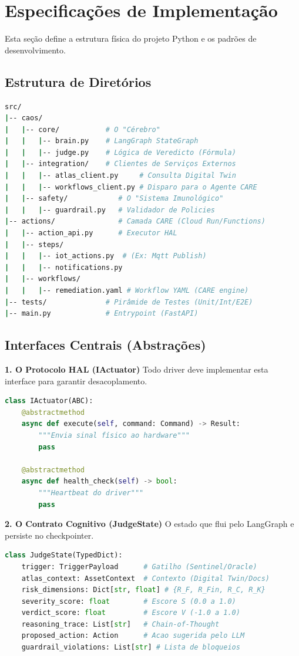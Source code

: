 \documentclass[12pt, a4paper]{article}
\begin{document}
\section{Especificações de Implementação}
\label{sec:specs}

Esta seção define a estrutura física do projeto Python e os padrões de desenvolvimento.

\subsection{Estrutura de Diretórios}
\begin{lstlisting}[language=bash]
src/
|-- caos/
|   |-- core/           # O "Cérebro"
|   |   |-- brain.py    # LangGraph StateGraph
|   |   |-- judge.py    # Lógica de Veredicto (Fórmula)
|   |-- integration/    # Clientes de Serviços Externos
|   |   |-- atlas_client.py     # Consulta Digital Twin
|   |   |-- workflows_client.py # Disparo para o Agente CARE
|   |-- safety/            # O "Sistema Imunológico"
|   |   |-- guardrail.py   # Validador de Policies
|-- actions/               # Camada CARE (Cloud Run/Functions)
|   |-- action_api.py      # Executor HAL
|   |-- steps/
|   |   |-- iot_actions.py  # (Ex: Mqtt Publish)
|   |   |-- notifications.py
|   |-- workflows/
|   |   |-- remediation.yaml # Workflow YAML (CARE engine)
|-- tests/              # Pirâmide de Testes (Unit/Int/E2E)
|-- main.py             # Entrypoint (FastAPI)
\end{lstlisting}

\subsection{Interfaces Centrais (Abstrações)}

\textbf{1. O Protocolo HAL (IActuator)}
Todo driver deve implementar esta interface para garantir desacoplamento.
\begin{lstlisting}[language=Python]
class IActuator(ABC):
    @abstractmethod
    async def execute(self, command: Command) -> Result:
        """Envia sinal físico ao hardware"""
        pass
        
    @abstractmethod
    async def health_check(self) -> bool:
        """Heartbeat do driver"""
        pass
\end{lstlisting}

\textbf{2. O Contrato Cognitivo (JudgeState)}
O estado que flui pelo LangGraph e persiste no checkpointer.
\begin{lstlisting}[language=Python]
class JudgeState(TypedDict):
    trigger: TriggerPayload      # Gatilho (Sentinel/Oracle)
    atlas_context: AssetContext  # Contexto (Digital Twin/Docs)
    risk_dimensions: Dict[str, float] # {R_F, R_Fin, R_C, R_K}
    severity_score: float        # Escore S (0.0 a 1.0)
    verdict_score: float         # Escore V (-1.0 a 1.0)
    reasoning_trace: List[str]   # Chain-of-Thought
    proposed_action: Action      # Acao sugerida pelo LLM
    guardrail_violations: List[str] # Lista de bloqueios
\end{lstlisting}
\end{document}
